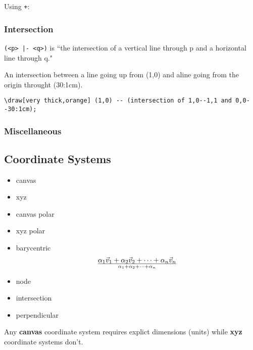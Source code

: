 Using \verb|+|:

\subsubsection{Intersection}
\verb/(<p> |- <q>)/ is ``the intersection of a vertical line through p and a horizontal line through q."

An intersection between a line going up from (1,0) and aline going from 
the origin throught (30:1cm).

\begin{tcolorbox}
    \verb|\draw[very thick,orange] (1,0) -- (intersection of 1,0--1,1 and 0,0--30:1cm);|
\end{tcolorbox}

\subsubsection{Miscellaneous}
\subsection{Coordinate Systems}
\begin{itemize}
    \item canvas
    \item xyz
    \item canvas polar
    \item xyz polar
    \item barycentric
	\[
	    {\alpha_1\vec{v}_1 + \alpha_2\vec{v}_2 + \cdots + \alpha_n\vec{v}_n} \over {\alpha_1 + \alpha_2 + \cdots + \alpha_n}
	    \]
    \item node
    \item intersection
    \item perpendicular
\end{itemize}
Any {\bf canvas} coordinate system requires explict dimensions (units)
while {\bf xyz} coordinate systems don't.

